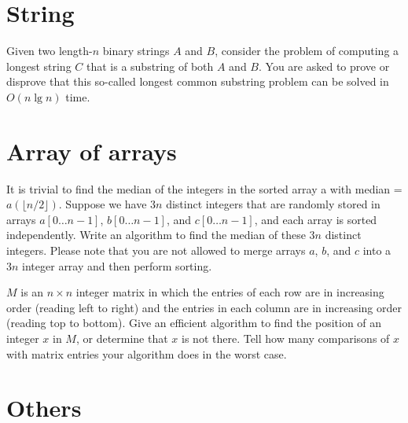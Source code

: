 \section{String}
\begin{Exercise}
Given two length-$n$ binary strings $A$ and $B$, consider the problem of computing a longest string $C$ that is a substring of both $A$ and $B$. You are asked to prove or disprove that this so-called longest common substring problem can be solved in $O(n \lg n)$ time. 
\end{Exercise}
\begin{Answer}
\end{Answer}

\section{Array of arrays}

\begin{Exercise}
It is trivial to find the median of the integers in the sorted array a with median = $a(\lfloor n/2 \rfloor)$. Suppose we have $3n$ distinct integers that are randomly stored in arrays $a[0 \dots n-1]$, $b[0 \dots n-1]$, and $c[0 \dots n-1]$, and each array is sorted independently. Write an algorithm to find the median of these $3n$ distinct integers. Please note that you are not allowed to merge arrays $a$, $b$, and $c$ into a $3n$ integer array and then perform sorting. 
\end{Exercise}
\begin{Answer}
\end{Answer}

\begin{Exercise}
$M$ is an $n \times n$ integer matrix in which the entries of each row are in increasing order (reading left to right) and the entries in each column are in increasing order (reading top to bottom). Give an efficient algorithm to find the position of an integer $x$ in $M$, or determine that $x$ is not there. Tell how many comparisons of $x$ with matrix entries your algorithm does in the worst case. 
\end{Exercise}
\begin{Answer}
\end{Answer}


\section{Others}


